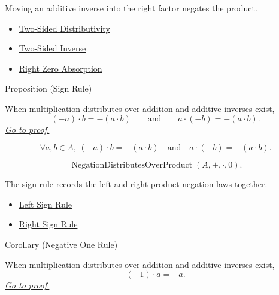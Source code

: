 \begin{remark*}[Interpretation]
Moving an additive inverse into the right factor negates the product.
\end{remark*}

\begin{dependencies}
\begin{itemize}
  \item \hyperref[def:two-sided-distributivity]{Two-Sided Distributivity}
  \item \hyperref[def:two-sided-inverse]{Two-Sided Inverse}
  \item \hyperref[prop:right-zero-absorption]{Right Zero Absorption}
\end{itemize}
\end{dependencies}

\begin{propositionbox}{Proposition (Sign Rule)}
\begin{proposition}
\label{prop:sign-rule}
When multiplication distributes over addition and additive inverses exist,
\[
(-a)\cdot b=-(a\cdot b)
\qquad\text{and}\qquad
a\cdot(-b)=-(a\cdot b).
\]
\hyperref[prf:sign-rule]{\textit{Go to proof.}}
\end{proposition}
\end{propositionbox}

\begin{remark*}
\[
\forall a,b\in A,\ (-a)\cdot b=-(a\cdot b)
\quad\text{and}\quad
a\cdot(-b)=-(a\cdot b).
\]
\end{remark*}

\begin{remark*}
\[
\operatorname{NegationDistributesOverProduct}(A,+,\cdot,0).
\]
\end{remark*}

\begin{remark*}[Interpretation]
The sign rule records the left and right product-negation laws together.
\end{remark*}

\begin{dependencies}
\begin{itemize}
  \item \hyperref[prop:left-sign-rule]{Left Sign Rule}
  \item \hyperref[prop:right-sign-rule]{Right Sign Rule}
\end{itemize}
\end{dependencies}

\begin{corollarybox}{Corollary (Negative One Rule)}
\begin{corollary}
\label{cor:negative-one-rule}
When multiplication distributes over addition and additive inverses exist,
\[
(-1)\cdot a=-a.
\]
\hyperref[prf:negative-one-rule]{\textit{Go to proof.}}
\end{corollary}
\end{corollarybox}

